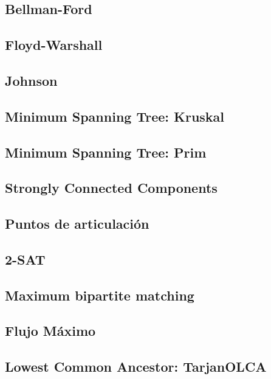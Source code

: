 \documentclass[10pt,letterpaper,twocolumn,twosided]{article}
\newcommand{\codigofuente}[1]{

\dotfill
}
\begin{document}
\codigofuente{../src/dijkstra.${EXT}}


\subsection{Bellman-Ford}

\subsection{Floyd-Warshall}

\subsection{Johnson}

\subsection{Minimum Spanning Tree: Kruskal}

\subsection{Minimum Spanning Tree: Prim}

\subsection{Strongly Connected Components}

\subsection{Puntos de articulación}

\subsection{2-SAT}

\subsection{Maximum bipartite matching}

\subsection{Flujo Máximo}

\subsection{Lowest Common Ancestor: TarjanOLCA}
\end{document}
